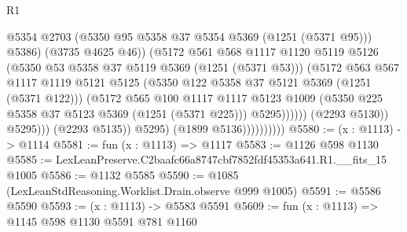 \begin{lexlean}{R1}
\begin{coremodule}
                                            @5354
                                            @2703
                                            (@5350 @95 @5358 @37 @5354 @5369 (@1251 (@5371 @95)))
                                            @5386)
                                          (@3735 @4625 @46))
                                        (@5172
                                          @561
                                          @568
                                          @1117
                                          @1120
                                          @5119
                                          @5126
                                          (@5350 @53 @5358 @37 @5119 @5369 (@1251 (@5371 @53)))
                                          (@5172
                                            @563
                                            @567
                                            @1117
                                            @1119
                                            @5121
                                            @5125
                                            (@5350 @122 @5358 @37 @5121 @5369 (@1251 (@5371 @122)))
                                            (@5172
                                              @565
                                              @100
                                              @1117
                                              @1117
                                              @5123
                                              @1009
                                              (@5350
                                                @225
                                                @5358
                                                @37
                                                @5123
                                                @5369
                                                (@1251 (@5371 @225)))
                                              @5295))))))
                                  (@2293 @5130))
                                @5295)))
                          (@2293 @5135))
                        @5295)
                      (@1899 @5136))))))))))
@5580 := (x : @1113) -> @1114
@5581 := fun (x : @1113) => @1117
@5583 := @1126 @598 @1130
@5585 := LexLeanPreserve.C2baafc66a8747cbf7852fdf45353a641.R1.__fits_15 @1005
@5586 := @1132 @5585
@5590 := @1085 (LexLeanStdReasoning.Worklist.Drain.observe @999 @1005)
@5591 := @5586 @5590
@5593 := (x : @1113) -> @5583 @5591
@5609 := fun (x : @1113) =>
  @1145
    @598
    @1130
    @5591
    @781
    @1160

\end{coremodule}
\end{lexlean}
